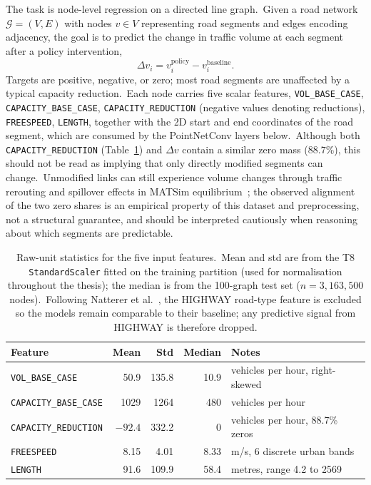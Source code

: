 The task is node-level regression on a directed line graph.\ Given a road network $\mathcal{G} = (V, E)$ with nodes $v \in V$ representing road segments and edges encoding adjacency, the goal is to predict the change in traffic volume at each segment after a policy intervention,
\begin{equation}\label{eq:target}
 \Delta v_i = v_i^\text{policy} - v_i^\text{baseline}.
\end{equation}
Targets are positive, negative, or zero; most road segments are unaffected by a typical capacity reduction.\ Each node carries five scalar features, \texttt{VOL\_BASE\_CASE}, \texttt{CAPACITY\_BASE\_CASE}, \texttt{CAPACITY\_REDUCTION} (negative values denoting reductions), \texttt{FREESPEED}, \texttt{LENGTH}, together with the 2D start and end coordinates of the road segment, which are consumed by the PointNetConv layers below.\ Although both \texttt{CAPACITY\_REDUCTION} (Table~\ref{tab:feature_stats}) and $\Delta v$ contain a similar zero mass ($88.7\%$), this should not be read as implying that only directly modified segments can change.\ Unmodified links can still experience volume changes through traffic rerouting and spillover effects in MATSim equilibrium~\cite{natterer2025ml}; the observed alignment of the two zero shares is an empirical property of this dataset and preprocessing, not a structural guarantee, and should be interpreted cautiously when reasoning about which segments are predictable.

\begin{table}[htbp]
\centering
\caption[Raw-unit statistics for the five input features]{Raw-unit statistics for the five input features.\ Mean and std are from the T8 \texttt{StandardScaler} fitted on the training partition (used for normalisation throughout the thesis); the median is from the 100-graph test set ($n = 3{,}163{,}500$ nodes).\ Following Natterer et al.~\cite{natterer2025ml}, the HIGHWAY road-type feature is excluded so the models remain comparable to their baseline; any predictive signal from HIGHWAY is therefore dropped.}
\label{tab:feature_stats}
\begin{tabular}{lrrrl}
\toprule
Feature & Mean & Std & Median & Notes \\
\midrule
\texttt{VOL\_BASE\_CASE}      & 50.9   & 135.8  & 10.9 & vehicles per hour, right-skewed \\
\texttt{CAPACITY\_BASE\_CASE} & 1029   & 1264   & 480  & vehicles per hour \\
\texttt{CAPACITY\_REDUCTION}  & $-92.4$ & 332.2 & 0    & vehicles per hour, 88.7\% zeros \\
\texttt{FREESPEED}            & 8.15   & 4.01   & 8.33 & m/s, 6 discrete urban bands \\
\texttt{LENGTH}               & 91.6   & 109.9  & 58.4 & metres, range 4.2 to 2569 \\
\bottomrule
\end{tabular}
\end{table}

